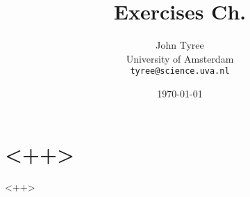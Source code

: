 \documentclass[a4paper,10pt]{article}
\title{Exercises Ch. }<++>
\author{John Tyree\\
University of Amsterdam\\
\texttt{tyree@science.uva.nl}}
\date{\today}
\begin{document}
\maketitle
\section*{<++>}
<++>
\end{document}
